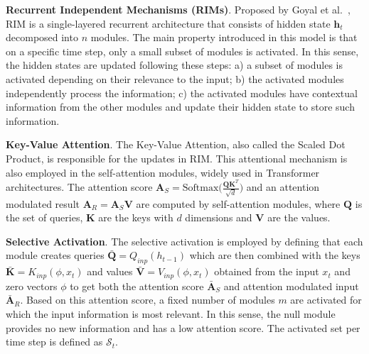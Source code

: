 
\textbf{Recurrent Independent Mechanisms (RIMs)}. Proposed by Goyal et al.~\cite{goyal2019recurrent}, RIM is a single-layered recurrent architecture that consists of hidden state $\textbf{h}_t$ decomposed into $n$ modules. The main property introduced in this model is that on a specific
time step, only a small subset of modules is activated. In this sense, the hidden states are updated following these steps: a) a subset of modules is activated depending on their relevance to the input; b) the activated modules independently process the information; c) the activated modules
have contextual information from the other modules and update their hidden state to store such information.

\textbf{Key-Value Attention}. The Key-Value Attention, also called the Scaled Dot Product, is responsible for the updates in RIM. This attentional mechanism is also employed in the self-attention modules, widely used in Transformer architectures. The attention score $\textbf{A}_S = \mathrm{Softmax} \bigg(\frac{\textbf{QK}^T}{\sqrt{d}}\bigg)$ and an attention modulated result $\textbf{A}_R = \textbf{A}_S\textbf{V}$ are computed by self-attention modules, where $\textbf{Q}$ is the set of queries, $\textbf{K}$ are the keys with $d$ dimensions and $\textbf{V}$ are the values.





\textbf{Selective Activation}. The selective activation is employed by defining that each module creates queries $\mathbf{\bar{Q}} = Q_{inp}(h_{t-1})$ which are then combined with the keys $\mathbf{\bar{K}} = K_{inp}(\phi, x_t)$ and values $\mathbf{\bar{V}} = V_{inp}(\phi, x_t)$ obtained from the input $x_t$ and zero vectors $\phi$ to get both
the attention score $\mathbf{\bar{A}}_S$ and attention modulated input $\mathbf{\bar{A}}_R$. Based on this attention score, a fixed number of modules $m$ are activated for which the input information is most relevant. In this sense, the null module provides no new information and has a low attention score. The activated set per time step is defined as $\mathcal{S}_t$.


